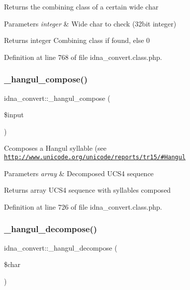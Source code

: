 Returns the combining class of a certain wide char 
\begin{DoxyParams}{Parameters}
{\em integer} & Wide char to check (32bit integer) \\
\hline
\end{DoxyParams}
\begin{DoxyReturn}{Returns}
integer Combining class if found, else 0 
\end{DoxyReturn}


Definition at line 768 of file idna\+\_\+convert.\+class.\+php.

\hypertarget{classidna__convert_a33124ab535f6739a2a5e6fa46c532d28}{}\label{classidna__convert_a33124ab535f6739a2a5e6fa46c532d28} 
\subsubsection{\texorpdfstring{\+\_\+hangul\+\_\+compose()}{\_hangul\_compose()}}
{\footnotesize\ttfamily idna\+\_\+convert\+::\+\_\+hangul\+\_\+compose (\begin{DoxyParamCaption}\item[{}]{\$input }\end{DoxyParamCaption})\hspace{0.3cm}{\ttfamily [protected]}}

Ccomposes a Hangul syllable (see \href{http://www.unicode.org/unicode/reports/tr15/#Hangul}{\tt http\+://www.\+unicode.\+org/unicode/reports/tr15/\#\+Hangul} 
\begin{DoxyParams}{Parameters}
{\em array} & Decomposed U\+C\+S4 sequence \\
\hline
\end{DoxyParams}
\begin{DoxyReturn}{Returns}
array U\+C\+S4 sequence with syllables composed 
\end{DoxyReturn}


Definition at line 726 of file idna\+\_\+convert.\+class.\+php.

\hypertarget{classidna__convert_a9cc5a89053729bb98d2a0ecf143b2b2c}{}\label{classidna__convert_a9cc5a89053729bb98d2a0ecf143b2b2c} 
\subsubsection{\texorpdfstring{\+\_\+hangul\+\_\+decompose()}{\_hangul\_decompose()}}
{\footnotesize\ttfamily idna\+\_\+convert\+::\+\_\+hangul\+\_\+decompose (\begin{DoxyParamCaption}\item[{}]{\$char }\end{DoxyParamCaption})\hspace{0.3cm}{\ttfamily [protected]}}

